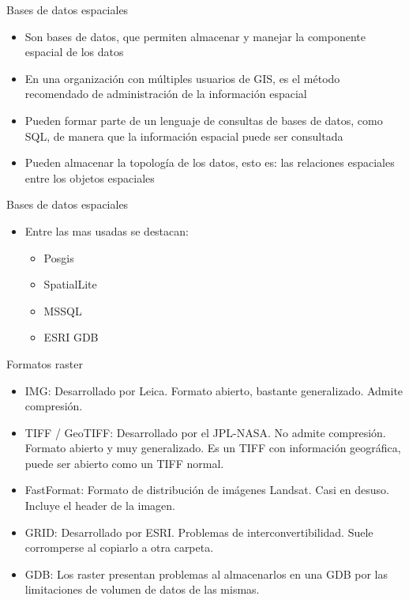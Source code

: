 \documentclass{beamer}
\begin{document}
\begin{frame}{Bases de datos espaciales}
		\begin{itemize}[<+->]
				\item Son bases de datos, que permiten almacenar y manejar la componente espacial de los datos
				\item En una organización con múltiples usuarios de GIS, es el método recomendado de administración de la información espacial
				\item Pueden formar parte de un lenguaje de consultas de bases de datos, como SQL, de manera que la información espacial puede ser consultada
				\item Pueden almacenar la topología de los datos, esto es: las relaciones espaciales entre los objetos espaciales
			\end{itemize}
\end{frame}

\begin{frame}{Bases de datos espaciales}
		\begin{itemize}[<+->]
		\item Entre las mas usadas se destacan:
		\begin{itemize}
			\item Posgis
			\item SpatialLite
			\item MSSQL
			\item ESRI GDB
		\end{itemize}
	\end{itemize}
\end{frame}

\begin{frame}{Formatos raster}
	\begin{itemize}[<+->]
		\item IMG: Desarrollado por Leica. Formato abierto, bastante generalizado. Admite compresión.
		\item TIFF / GeoTIFF: Desarrollado por el JPL-NASA. No admite compresión. Formato abierto y muy generalizado. Es un TIFF con información geográfica, puede ser abierto como un TIFF normal. 
		\item FastFormat: Formato de distribución de imágenes Landsat. Casi en desuso. Incluye el header de la imagen.
		\item GRID: Desarrollado por ESRI. Problemas de interconvertibilidad. Suele corromperse al copiarlo a otra carpeta.
		\item GDB: Los raster presentan problemas al almacenarlos en una GDB por las limitaciones de volumen de datos de las mismas.
	\end{itemize}
\end{frame}
\end{document}
